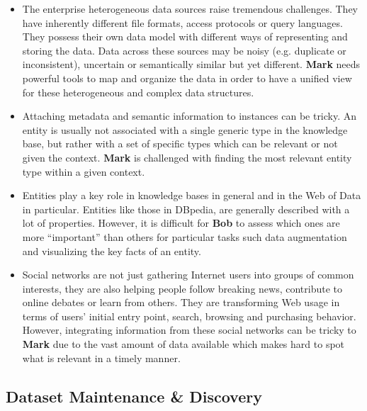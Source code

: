 \begin{itemize}
	\item The enterprise heterogeneous data sources raise tremendous challenges. They have inherently different file formats, access protocols or query languages. They possess their own data model with different ways of representing and storing the data. Data across these sources may be noisy (e.g. duplicate or inconsistent), uncertain or semantically similar but yet different. \textbf{Mark} needs powerful tools to map and organize the data in order to have a unified view for these heterogeneous and complex data structures.
	\item Attaching metadata and semantic information to instances can be tricky. An entity is usually not associated with a single generic type in the knowledge base, but rather with a set of specific types which can be relevant or not given the context. \textbf{Mark} is challenged with finding the most relevant entity type within a given context.
	\item Entities play a key role in knowledge bases in general and in the Web of Data in particular. Entities like those in DBpedia, are generally described with a lot of properties. However, it is difficult for \textbf{Bob} to assess which ones are more ``important'' than others for particular tasks such data augmentation and visualizing the key facts of an entity.
	\item Social networks are not just gathering Internet users into groups of common interests, they are also helping people follow breaking news, contribute to online debates or learn from others. They are transforming Web usage in terms of users' initial entry point, search, browsing and purchasing behavior. However, integrating information from these social networks can be tricky to \textbf{Mark} due to the vast amount of data available which makes hard to spot what is relevant in a timely manner.
\end{itemize}

\subsection{Dataset Maintenance \& Discovery}

